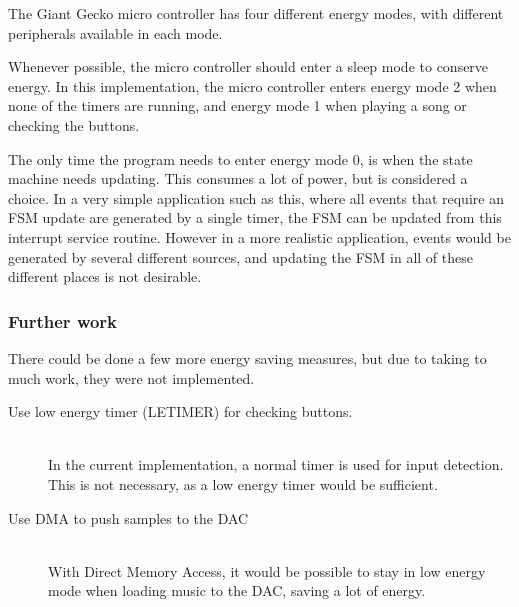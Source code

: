 The Giant Gecko micro controller has four different energy modes, with different peripherals available in each mode.

Whenever possible, the micro controller should enter a sleep mode to conserve energy.
In this implementation, the micro controller enters energy mode 2 when none of the timers are running, and energy mode 1 when playing a song or checking the buttons.

The only time the program needs to enter energy mode 0, is when the state machine needs updating.
This consumes a lot of power, but is considered a choice.
In a very simple application such as this, where all events that require an FSM update are generated by a single timer, the FSM can be updated from this interrupt service routine.
However in a more realistic application, events would be generated by several different sources, and updating the FSM in all of these different places is not desirable.


\subsubsection{Further work}
There could be done a few more energy saving measures, but due to taking to much work, they were not implemented.


\begin{description}
  \item[Use low energy timer (LETIMER) for checking buttons.] \hfill \\
        In the current implementation, a normal timer is used for input detection. This is not necessary, as a low energy timer would be sufficient. 
  \item[Use DMA to push samples to the DAC] \hfill \\
        With Direct Memory Access, it would be possible to stay in low energy mode when loading music to the DAC, saving a lot of energy.
\end{description}



